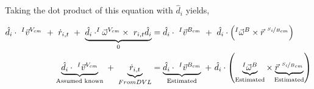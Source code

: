 Taking the dot product of this equation with $\hat{d}_{i} $ yields,

    \begin{align}
    \hat{d}_{i} \cdot~^{I}\vec{v}^{V_{cm}} ~+~ \dot{r}_{i,t}  ~+~ \underbrace{\hat{d}_{i} \cdot^{I}\vec{\omega}^{V_{cm}}\times{~r_{i,t}\hat{d}_{i}}}_{0}  &=
     \label{eqn:expensive}
    \hat{d}_{i} \cdot~^{I}\vec{v}^{B_{cm}} ~ + ~\hat{d}_{i} \cdot\left(^{I}\vec{\omega}^{B}\times\vec{r}^{~\nicefrac{S_i}{B_{cm}}}\right)  \\
    \underbrace{\hat{d}_{i} \cdot~^{I}\vec{v}^{V_{cm}}}_{\text{Assumed known}} ~+~ \underbrace{\dot{r}_{i,t} }_{From DVL}  &=
    \underbrace{\hat{d}_{i} \cdot~^{I}\vec{v}^{B_{cm}}}_{\text{Estimated}} ~ + ~\hat{d}_{i} \cdot\left(\underbrace{^{I}\vec{\omega}^{B}}_{\text{Estimated}}\times\underbrace{\vec{r}^{~\nicefrac{S_i}{B_{cm}}}}_{\text{Estimated}}\right)  
         \label{eqn:expensive}
\end{align}